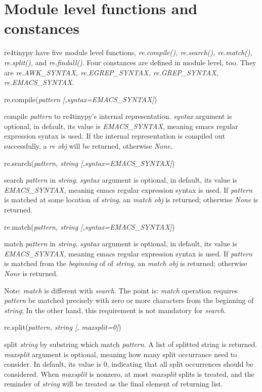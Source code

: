 \documentclass[12pt]{article}
\begin{document}
\section{Module level functions and constances}


re4tinypy have five module level functions, {\em re.compile(), re.search(), re.match(), re.split(),} and {\em re.findall()}. Four constances are defined in module level, too. They are {\em re.AWK\_SYNTAX, re.EGREP\_SYNTAX, re.GREP\_SYNTAX, re.EMACS\_SYNTAX}.



re.compile({\em pattern [,syntax=EMACS\_SYNTAX]})


compile {\em pattern} to re4tinypy's internal representation. {\em syntax} argument is optional, in default, its value is {\em EMACS\_SYNTAX}, meaning emacs regular expression syntax is used. If the internal representation is compiled out successfully, a {\em re obj} will be returned, otherwise {\em None}.


re.search({\em pattern, string [,syntax=EMACS\_SYNTAX]})

search {\em pattern} in {\em string}. {\em syntax} argument is optional, in default, its value is {\em EMACS\_SYNTAX}, meaning emacs regular expression syntax is used. If {\em pattern} is matched at some location of {\em string}, an {\em match obj} is returned; otherwise {\em None} is returned.

re.match({\em pattern, string [,syntax=EMACS\_SYNTAX]})


match {\em pattern} in {\em string}. {\em syntax} argument is optional, in default, its value is {\em EMACS\_SYNTAX}, meaning emacs regular expression syntax is used. If {\em pattern} is matched from the {\em beginning} of of {\em string}, an {\em match obj} is returned; otherwise {\em None} is returned.

Note: {\em match} is different with {\em search}. The point is: {\em match} operation requires {\em pattern} be matched precisely with zero or more characters from the beginning of {\em string}; In the other hand, this requirement is not mandatory for {\em search}.


re.split({\em pattern, string [, maxsplit=0]})


split {\em string} by substring which match {\em pattern}. A list of splitted string is returned. {\em maxsplit} argument is optional, meaning how many split occurrance need to consider. In default, its value is 0, indicating that all split occurrences should be considered. When {\em maxsplit} is nonzero, at most {\em maxsplit} splits is treated, and the reminder of {\em string} will be treated as the final element of returning list.
\end{document}
